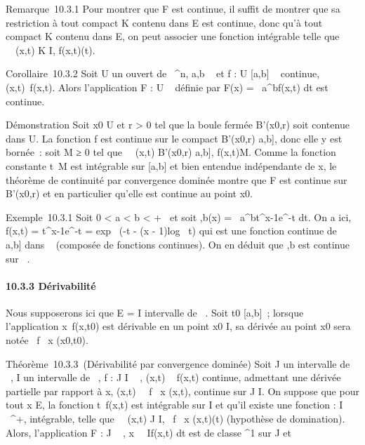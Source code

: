 Remarque~10.3.1 Pour montrer que F est continue, il suffit de montrer
que sa restriction à tout compact K contenu dans E est continue, donc
qu'à tout compact K contenu dans E, on peut associer une fonction
\phiK intégrable telle que \forall~~(x,t) \in K \times
I, \textbar{}f(x,t)\textbar{}\leq \phiK(t).

Corollaire~10.3.2 Soit U un ouvert de ~^n, a,b \in {}~ et f : U \times
{[}a,b{]} \rightarrow~  continue, (x,t)\mapsto~f(x,t). Alors
l'application F : U \rightarrow~  définie par F(x) =\int ~
a^bf(x,t) dt est continue.

Démonstration Soit x0 \in U et r \textgreater{} 0 tel que la
boule fermée B'(x0,r) soit contenue dans U. La fonction f est
continue sur le compact B'(x0,r) \times {[}a,b{]}, donc elle y est
bornée~: soit M ≥ 0 tel que \forall~~(x,t) \in
B'(x0,r) \times {[}a,b{]}, \textbar{}f(x,t)\textbar{}\leq M. Comme la
fonction constante t\mapsto~M est intégrable sur
{[}a,b{]} et bien entendue indépendante de x, le théorème de continuité
par convergence dominée montre que F est continue sur B'(x0,r)
et en particulier qu'elle est continue au point x0.

Exemple~10.3.1 Soit 0 \textless{} a \textless{} b \textless{} +\infty~ et soit
\Gammaa,b(x) =\int ~
a^bt^x-1e^-t dt. On a ici, f(x,t) =
t^x-1e^-t = exp~ (-t - (x
- 1)log~ t) qui est une fonction continue de ~
\times {[}a,b{]} dans ~ (composée de fonctions continues). On en déduit que
\Gammaa,b est continue sur ~.

\paragraph{10.3.3 Dérivabilité}

Nous supposerons ici que E = I intervalle de ~. Soit t0 \in
{[}a,b{]}~; lorsque l'application
x\mapsto~f(x,t0) est dérivable en un point
x0 \in I, sa dérivée au point x0 sera notée  \partial~f
\over \partial~x (x0,t0).

Théorème~10.3.3~(Dérivabilité par convergence dominée) Soit J un
intervalle de ~, I un intervalle de ~, f : J \times I \rightarrow~ , (x,t) \rightarrow~ f(x,t)
continue, admettant une dérivée partielle par rapport à x,
(x,t)\mapsto~ \partial~f \over \partial~x (x,t),
continue sur J \times I. On suppose que pour tout x \in E, la fonction
t\mapsto~f(x,t) est intégrable sur I et qu'il existe
une fonction \phi : I \rightarrow~ ~^+, intégrable, telle que
\forall~~(x,t) \in J \times I, \textbar{} \partial~f
\over \partial~x (x,t)\textbar{}\leq \phi(t) (hypothèse de
domination). Alors, l'application F : J \rightarrow~ ,
x\mapsto~\int ~
If(x,t) dt est de classe ^1 sur J et

